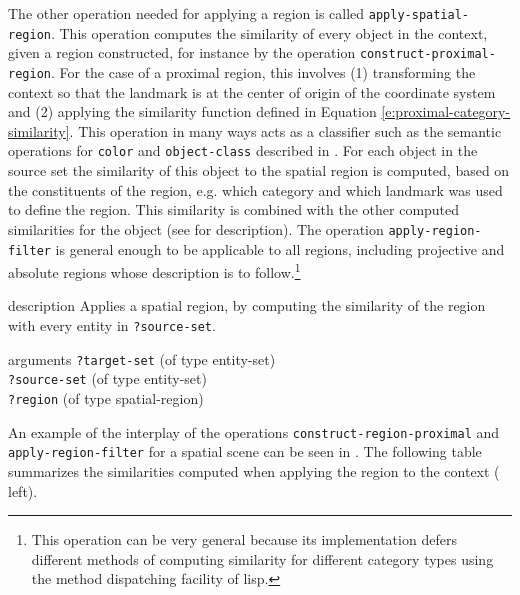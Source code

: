 The other operation needed for applying a region is called 
{\footnotesize\tt apply-spatial-region}. This operation computes the similarity of 
every object in the context, given a region constructed, for instance by the 
operation {\footnotesize\tt construct-proximal-region}. For the case of 
a proximal region, this involves (1) transforming the context so
that the landmark is at the center of origin of the coordinate system
and (2) applying the similarity function defined in Equation 
\ref{e:proximal-category-similarity}. This operation in many ways
acts as a classifier such as the semantic operations for {\footnotesize\tt color}
and {\footnotesize\tt object-class} described in .\enlargethispage{1\baselineskip}
For each object in the source set the similarity of this object to the 
spatial region is computed, based on the constituents of the region,
e.g. which category and which landmark was used to define the region.
This similarity is combined with the other computed similarities for
the object (see  for description). 
The operation {\footnotesize\tt apply-region-filter} 
is general enough to be applicable to all regions, including projective and absolute 
regions whose description is to follow.\footnote{This operation can
be very general because its implementation defers different
methods of computing similarity for different category types
using the method dispatching facility of lisp.}

\begin{explanation}{description}
Applies a spatial region, by computing the similarity of the region
with every entity in {\footnotesize\verb+?source-set+}.
\end{explanation}
\begin{explanation}{arguments}
{\footnotesize\verb+?target-set+} (of type entity-set) \\
{\footnotesize\verb+?source-set+} (of type entity-set) \\
{\footnotesize\verb+?region+} (of type spatial-region)
\vspace{0.3cm}
\end{explanation}

An example of the interplay of the operations 
{\footnotesize\tt construct-region-proximal} 
and {\footnotesize\tt apply-region-filter} for
a spatial scene can be seen in
. The following table 
summarizes the similarities computed when applying 
the region to the context (
left).

